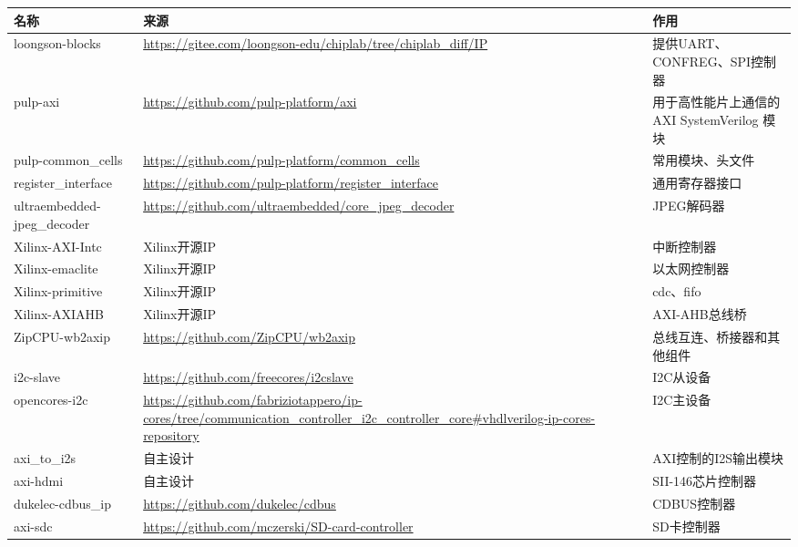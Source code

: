 \begin{longtable}[]{@{}
  >{\raggedright\arraybackslash}p{}
  >{\raggedright\arraybackslash}p{}
  >{\raggedright\arraybackslash}p{}@{}}
\toprule\noalign{}
\begin{minipage}[b]{\linewidth}\raggedright
名称
\end{minipage} & \begin{minipage}[b]{\linewidth}\raggedright
来源
\end{minipage} & \begin{minipage}[b]{\linewidth}\raggedright
作用
\end{minipage} \\
\midrule\noalign{}
\endhead
\bottomrule\noalign{}
\endlastfoot
loongson-blocks & \url{https://gitee.com/loongson-edu/chiplab/tree/chiplab_diff/IP} & 提供UART、CONFREG、SPI控制器 \\
pulp-axi & \url{https://github.com/pulp-platform/axi} & 用于高性能片上通信的 AXI SystemVerilog 模块 \\
pulp-common\_cells & \url{https://github.com/pulp-platform/common_cells} & 常用模块、头文件 \\
register\_interface & \url{https://github.com/pulp-platform/register_interface} & 通用寄存器接口 \\
ultraembedded-jpeg\_decoder & \url{https://github.com/ultraembedded/core_jpeg_decoder} & JPEG解码器 \\
Xilinx-AXI-Intc & Xilinx开源IP & 中断控制器 \\
Xilinx-emaclite & Xilinx开源IP & 以太网控制器 \\
Xilinx-primitive & Xilinx开源IP & cdc、fifo \\
Xilinx-AXIAHB & Xilinx开源IP & AXI-AHB总线桥 \\
ZipCPU-wb2axip & \url{https://github.com/ZipCPU/wb2axip} & 总线互连、桥接器和其他组件 \\
i2c-slave & \url{https://github.com/freecores/i2cslave} & I2C从设备 \\
opencores-i2c & \url{https://github.com/fabriziotappero/ip-cores/tree/communication_controller_i2c_controller_core\#vhdlverilog-ip-cores-repository} & I2C主设备 \\
axi\_to\_i2s & 自主设计 & AXI控制的I2S输出模块 \\
axi-hdmi & 自主设计 & SII-146芯片控制器 \\
dukelec-cdbus\_ip & \url{https://github.com/dukelec/cdbus} & CDBUS控制器 \\
axi-sdc & \url{https://github.com/mczerski/SD-card-controller} & SD卡控制器 \\
\end{longtable}

